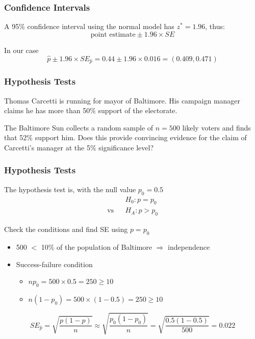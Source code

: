 \documentclass[handout]{beamer}
\newcommand{\blue}[1]{\textcolor{blue2}{#1}}
\newcommand{\phat}{\widehat{p}}
\begin{document}
\begin{frame}[fragile]
\frametitle{Confidence Intervals}

%
%
A 95\% confidence interval using the normal model has $z^*=1.96$, thus:
\[
\mbox{point estimate} \pm 1.96 \times SE
\]

\pause In our case
\[
\phat \pm 1.96\times SE_{\phat} = 0.44 \pm 1.96 \times 0.016 = (0.409, 0.471)
\]

\end{frame}


\begin{frame}[fragile]
\frametitle{Hypothesis Tests}
Thomas Carcetti is running for mayor of Baltimore.  His campaign manager \blue{claims} he has more than 50\% support of the electorate.  

\vspace{0.5cm}

\pause The Baltimore Sun collects a random sample of $n=500$ likely voters and finds that 52\% support him.  Does this provide convincing evidence for the claim of Carcetti's manager at the 5\% significance level?

\end{frame}


\begin{frame}[fragile]
\frametitle{Hypothesis Tests}

%
%
The hypothesis test is, with the null value $p_0=0.5$
\begin{eqnarray*}
&& H_0: p = p_0\\
\mbox{vs}&& H_A: p > p_0 
\end{eqnarray*}

\pause Check the conditions and find SE \blue{using $p=p_0$}
\begin{itemize}
\pause \item 500 $<$ 10\% of the population of Baltimore $\Rightarrow$ independence
\pause \item Success-failure condition 
\begin{itemize}
\item $np_0 = 500 \times 0.5 = 250 \geq 10$
\item $n(1-p_0) = 500 \times (1-0.5) = 250 \geq 10$
\end{itemize}
\end{itemize}
\pause
\[
SE_{\phat} = \sqrt{\frac{p(1-p)}{n}} \approx \sqrt{\frac{p_0(1-p_0)}{n}} = \sqrt{\frac{0.5(1-0.5)}{500}} = 0.022
\]

\end{frame}
\end{document}
